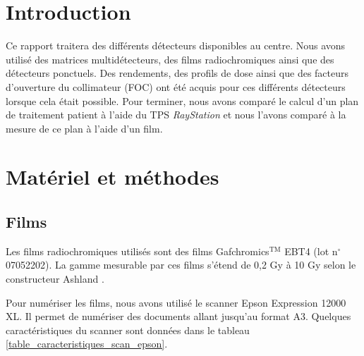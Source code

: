 \documentclass{book}
\begin{document}




\onehalfspacing

\pagestyle{fancy}
	\renewcommand\headrulewidth{0.5pt}
	\renewcommand\footrulewidth{0.5pt}
	\fancyfoot[R]{\thepage}

\tableofcontents
\clearpage
\chapter{Introduction}

Ce rapport traitera des différents détecteurs disponibles au centre. Nous avons utilisé des matrices multidétecteurs, des films radiochromiques ainsi que des détecteurs ponctuels. Des rendements, des profils de dose ainsi que des facteurs d'ouverture du collimateur (FOC) ont été acquis pour ces différents détecteurs lorsque cela était possible. Pour terminer, nous avons comparé le calcul d'un plan de traitement patient à l'aide du TPS \textit{RayStation} et nous l'avons comparé à la mesure de ce plan à l'aide d'un film.

\chapter{Matériel et méthodes}
\section{Films}

Les films radiochromiques utilisés sont des films Gafchromics$^{\text{TM}}$ EBT4 (lot n$^{\circ}$07052202). La gamme mesurable par ces films s'étend de 0,2 Gy à 10 Gy selon le constructeur Ashland \cite{EBT4}.

Pour numériser les films, nous avons utilisé le scanner Epson Expression 12000 XL. Il permet de numériser des documents allant jusqu'au format A3. Quelques caractéristiques du scanner sont données dans le tableau \ref*{table_caracteristiques_scan_epson}.
\end{document}
